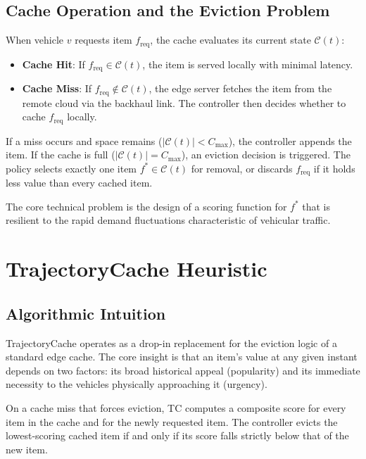 \documentclass[preprint,12pt]{elsarticle}
\begin{document}
	\subsection{Cache Operation and the Eviction Problem}
	
	When vehicle $v$ requests item $f_\text{req}$, the cache evaluates its current state $\mathcal{C}(t)$:
	\begin{itemize}
		\item \textbf{Cache Hit}: If $f_\text{req} \in \mathcal{C}(t)$, the item is served locally with minimal latency.
		\item \textbf{Cache Miss}: If $f_\text{req} \notin \mathcal{C}(t)$, the edge server fetches the item from the remote cloud via the backhaul link. The controller then decides whether to cache $f_\text{req}$ locally.
	\end{itemize}
	
	If a miss occurs and space remains ($|\mathcal{C}(t)| < C_\text{max}$), the controller appends the item. If the cache is full ($|\mathcal{C}(t)| = C_\text{max}$), an eviction decision is triggered. The policy selects exactly one item $f^* \in \mathcal{C}(t)$ for removal, or discards $f_\text{req}$ if it holds less value than every cached item.
	
	The core technical problem is the design of a scoring function for $f^*$ that is resilient to the rapid demand fluctuations characteristic of vehicular traffic.
	
	\section{TrajectoryCache Heuristic}
	\label{sec:method}
	
	\subsection{Algorithmic Intuition}
	
	TrajectoryCache operates as a drop-in replacement for the eviction logic of a standard edge cache. The core insight is that an item's value at any given instant depends on two factors: its broad historical appeal (popularity) and its immediate necessity to the vehicles physically approaching it (urgency).
	
	On a cache miss that forces eviction, TC computes a composite score for every item in the cache and for the newly requested item. The controller evicts the lowest-scoring cached item if and only if its score falls strictly below that of the new item.
	
\end{document}
